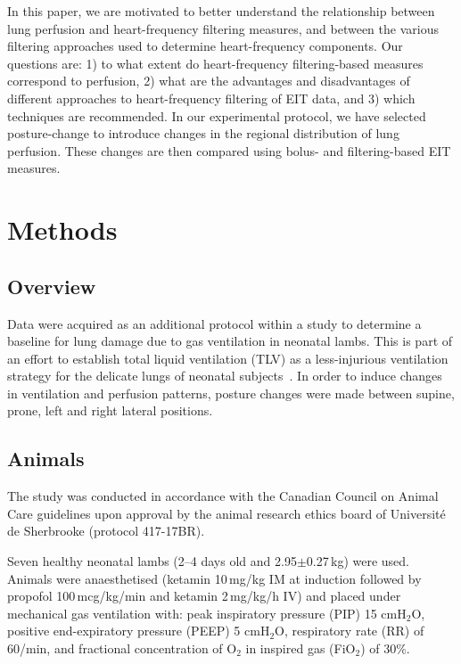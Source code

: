 In this paper, we are motivated to better understand the relationship between
lung perfusion and heart-frequency filtering measures, and between the various filtering
approaches used to determine heart-frequency components. Our questions are:
1) to what extent do heart-frequency filtering-based measures correspond to perfusion,
2) what are the advantages and disadvantages of different approaches
to heart-frequency filtering of EIT data, and 3) which techniques are recommended.
In our experimental protocol, we have selected posture-change 
to introduce changes in the regional distribution of lung perfusion.
These changes are then compared using bolus- and filtering-based
EIT measures.



\section{Methods}
\subsection{Overview}
Data were acquired as an additional protocol within 
a study to determine a baseline for 
lung damage due to gas ventilation in neonatal lambs. 
This is part of an effort to establish total liquid ventilation (TLV) as a less-injurious 
ventilation strategy for the delicate lungs of neonatal 
subjects~\parencite{sage_assessing_2018}. In order to induce changes in ventilation 
and perfusion patterns, 
posture changes were made between supine, prone, left and right lateral positions. 


\subsection{Animals}  \label{animals}
The study was conducted in accordance with the Canadian Council 
on Animal Care guidelines upon approval by the animal research ethics 
board of Universit\'e de Sherbrooke (protocol 417-17BR). 

Seven healthy neonatal lambs (2--4
days old and 2.95$\pm$0.27\,kg) were used.
Animals were anaesthetised (ketamin 10\,mg/kg IM at induction followed by 
propofol 100\,mcg/kg/min and ketamin 2\,mg/kg/h IV) and placed 
under mechanical gas ventilation with: peak inspiratory pressure 
(PIP) 15 cmH$_2$O, positive end-expiratory pressure (PEEP) 5 cmH$_2$O, 
respiratory rate (RR) of 60/min, and fractional concentration of O$_2$ in 
inspired gas (FiO$_2$) of 30\%.

